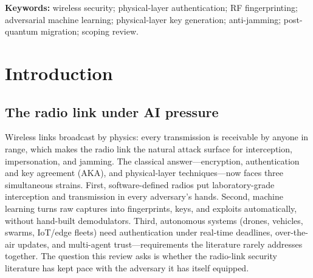 \documentclass[11pt,a4paper]{article}
\begin{document}
\noindent\textbf{Keywords:} wireless security; physical-layer authentication; RF fingerprinting; adversarial machine learning; physical-layer key generation; anti-jamming; post-quantum migration; scoping review.

\section{Introduction}
\label{sec:intro}
\subsection{The radio link under AI pressure}
Wireless links broadcast by physics: every transmission is receivable by anyone in range, which makes the radio link the natural attack surface for interception, impersonation, and jamming. The classical answer---encryption, authentication and key agreement (AKA), and physical-layer techniques---now faces three simultaneous strains. First, software-defined radios put laboratory-grade interception and transmission in every adversary's hands. Second, machine learning turns raw captures into fingerprints, keys, and exploits automatically, without hand-built demodulators. Third, autonomous systems (drones, vehicles, swarms, IoT/edge fleets) need authentication under real-time deadlines, over-the-air updates, and multi-agent trust---requirements the literature rarely addresses together. The question this review asks is whether the radio-link security literature has kept pace with the adversary it has itself equipped.
\end{document}
